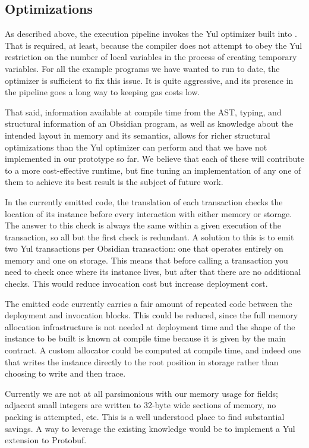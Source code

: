 \subsection{Optimizations}

As described above, the execution pipeline invokes the Yul optimizer built
into \solc. That is required, at least, because the compiler does not
attempt to obey the Yul restriction on the number of local variables in the
process of creating temporary variables. For all the example programs we
have wanted to run to date, the optimizer is sufficient to fix this
issue. It is quite aggressive, and its presence in the pipeline goes a long
way to keeping gas costs low.

That said, information available at compile time from the AST, typing, and
structural information of an Obsidian program, as well as knowledge about
the intended layout in memory and its semantics, allows for richer
structural optimizations than the Yul optimizer can perform and that we
have not implemented in our prototype so far. We believe that each of these
will contribute to a more cost-effective runtime, but fine tuning an
implementation of any one of them to achieve its best result is the subject
of future work.

In the currently emitted code, the translation of each transaction checks
the location of its instance before every interaction with either
memory or storage. The answer to this check is always the same within a
given execution of the transaction, so all but the first check is
redundant. A solution to this is to emit two Yul transactions per Obsidian
transaction: one that operates entirely on memory and one on storage. This
means that before calling a transaction you need to check once where its
instance lives, but after that there are no additional checks. This would reduce invocation cost
but increase deployment cost.

The emitted code currently carries a fair amount of repeated code between
the deployment and invocation blocks. This could be reduced, since the full
memory allocation infrastructure is not needed at deployment time and the
shape of the instance to be built is known at compile time because it is
given by the main contract. A custom allocator could be computed at compile
time, and indeed one that writes the instance directly to the root position
in storage rather than choosing to write and then trace.

Currently we are not at all parsimonious with our memory usage for fields;
adjacent small integers are written to 32-byte wide sections of memory, no
packing is attempted, etc. This is a well understood place to find
substantial savings. A way to leverage the existing knowledge would be to
implement a Yul extension to Protobuf. \cite{TODO}

